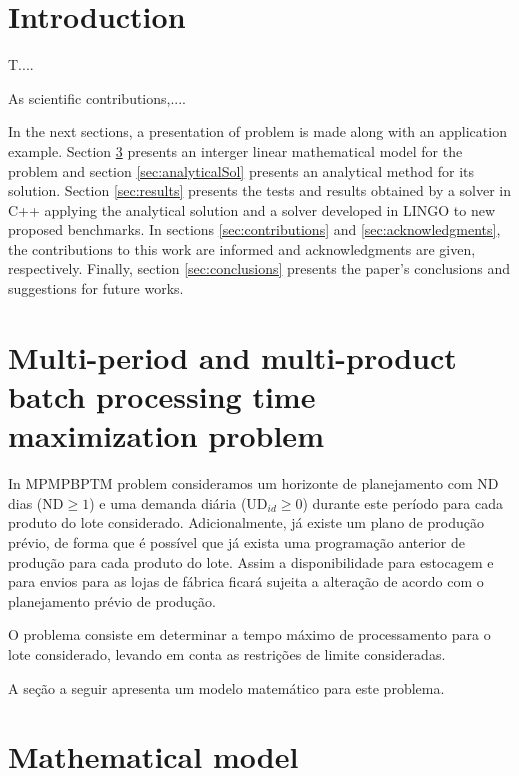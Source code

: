 \documentclass[authoryear,preprint,12pt]{elsarticle}
\begin{document}

\section{Introduction}
\label{sec:intro}

T....

As scientific contributions,....

In the next sections, a presentation of problem is made along with an application example. Section \ref{sec:mathModel} presents an interger linear mathematical model for the problem and section \ref{sec:analyticalSol} presents an analytical method for its solution. Section \ref{sec:results} presents the tests and results obtained by a solver in C++ applying the analytical solution and a solver developed in LINGO to new proposed benchmarks. In sections \ref{sec:contributions} and \ref{sec:acknowledgments}, the contributions to this work are informed and acknowledgments are given, respectively. Finally, section \ref{sec:conclusions} presents the paper's conclusions and suggestions for future works.

\section{Multi-period and multi-product batch processing time maximization problem}
\label{sec:MBPTMP}

In MPMPBPTM problem consideramos um horizonte de planejamento com $\textrm{ND}$ dias ($\textrm{ND} \geq 1$) e uma demanda diária ($\textrm{UD}_{id} \geq 0$) durante este período para cada produto do lote considerado. Adicionalmente, já existe um plano de produção prévio, de forma que é possível que já exista uma programação anterior de produção para cada produto do lote. Assim a disponibilidade para estocagem e para envios para as lojas de fábrica ficará sujeita a alteração de acordo com o planejamento prévio de produção.

O problema consiste em determinar a tempo máximo de processamento para o lote considerado, levando em conta as restrições de limite consideradas.  

A seção a seguir apresenta um modelo matemático para este problema.

\section{Mathematical model}
\label{sec:mathModel}
\end{document}
